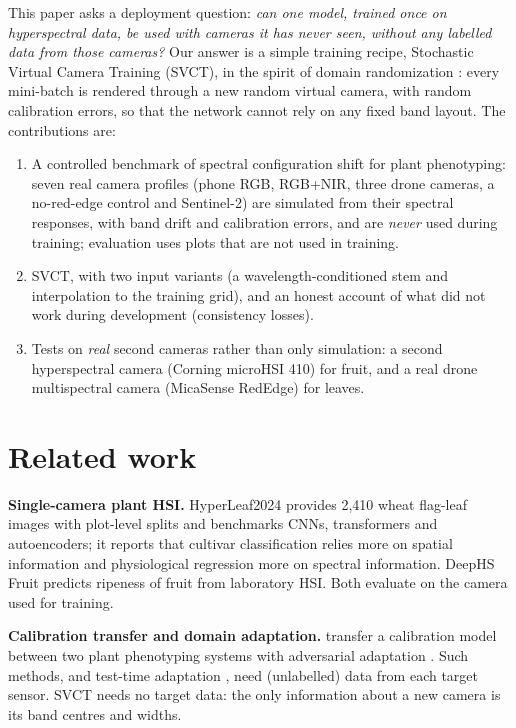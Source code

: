\documentclass[preprint,12pt,authoryear]{elsarticle}
\begin{document}
This paper asks a deployment question: \emph{can one model, trained once on hyperspectral data, be used with cameras it
has never seen, without any labelled data from those cameras?} Our answer is a simple training recipe, Stochastic Virtual
Camera Training (SVCT), in the spirit of domain randomization \citep{tobin2017domainrandomization}: every mini-batch is
rendered through a new random virtual camera, with random calibration errors, so that the network cannot rely on any
fixed band layout. The contributions are:
\begin{enumerate}
\item A controlled benchmark of spectral configuration shift for plant phenotyping: seven real camera profiles
(phone RGB, RGB+NIR, three drone cameras, a no-red-edge control and Sentinel-2) are simulated from their spectral
responses, with band drift and calibration errors, and are \emph{never} used during training; evaluation uses plots
that are not used in training.
\item SVCT, with two input variants (a wavelength-conditioned stem and interpolation to the training grid), and an
honest account of what did not work during development (consistency losses).
\item Tests on \emph{real} second cameras rather than only simulation: a second hyperspectral camera (Corning microHSI
410) for fruit, and a real drone multispectral camera (MicaSense RedEdge) for leaves.
\end{enumerate}

\section{Related work}
\textbf{Single-camera plant HSI.} HyperLeaf2024 \citep{laprade2024hyperleaf} provides 2,410 wheat flag-leaf images with
plot-level splits and benchmarks CNNs, transformers and autoencoders; it reports that cultivar classification relies more
on spatial information and physiological regression more on spectral information. DeepHS Fruit
\citep{varga2021ripeness,frank2023benchmark} predicts ripeness of fruit from laboratory HSI. Both evaluate on the camera
used for training.

\textbf{Calibration transfer and domain adaptation.} \citet{rehman2022calibration} transfer a calibration model between
two plant phenotyping systems with adversarial adaptation \citep{ganin2016dann}. Such methods, and test-time adaptation
\citep{wang2021tent}, need (unlabelled) data from each target sensor. SVCT needs no target data: the only information
about a new camera is its band centres and widths.
\end{document}
